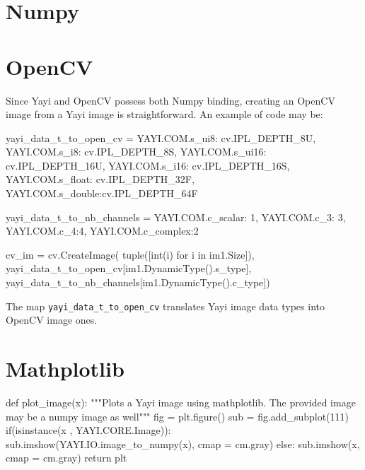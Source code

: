 
\section{Numpy}

\section{OpenCV}
\label{sec:link_opencv}
Since Yayi and OpenCV possess both Numpy binding, creating an OpenCV image from a Yayi image is straightforward. An example of code may be:

\begin{python}
yayi_data_t_to_open_cv = {
  YAYI.COM.s_ui8:   cv.IPL_DEPTH_8U, 
  YAYI.COM.s_i8:    cv.IPL_DEPTH_8S, 
  YAYI.COM.s_ui16:  cv.IPL_DEPTH_16U, 
  YAYI.COM.s_i16:   cv.IPL_DEPTH_16S, 
  YAYI.COM.s_float: cv.IPL_DEPTH_32F, 
  YAYI.COM.s_double:cv.IPL_DEPTH_64F}

 
yayi_data_t_to_nb_channels = {
  YAYI.COM.c_scalar: 1, 
  YAYI.COM.c_3: 3, 
  YAYI.COM.c_4:4, 
  YAYI.COM.c_complex:2}

cv_im = cv.CreateImage(
  tuple([int(i) for i in im1.Size]), 
  yayi_data_t_to_open_cv[im1.DynamicType().s_type], 
  yayi_data_t_to_nb_channels[im1.DynamicType().c_type])

\end{python}

The map \lstinline|yayi_data_t_to_open_cv| translates Yayi image data types into OpenCV image ones. 

\section{Mathplotlib}

\begin{python}
def plot_image(x):
  """Plots a Yayi image using mathplotlib. The provided image may be a numpy image as well"""
  fig = plt.figure()
  sub = fig.add_subplot(111)
  if(isinstance(x , YAYI.CORE.Image)):
    sub.imshow(YAYI.IO.image_to_numpy(x), cmap = cm.gray)
  else:
    sub.imshow(x, cmap = cm.gray)
  return plt
\end{python}